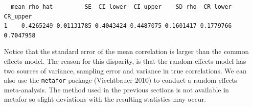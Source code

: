 \documentclass[
  letterpaper,
  DIV=11,
  numbers=noendperiod]{scrreprt}
\newenvironment{Shaded}{\begin{snugshade}}{\end{snugshade}}
\newcommand{\AttributeTok}[1]{\textcolor[rgb]{0.40,0.45,0.13}{#1}}
\newcommand{\CommentTok}[1]{\textcolor[rgb]{0.37,0.37,0.37}{#1}}
\newcommand{\DecValTok}[1]{\textcolor[rgb]{0.68,0.00,0.00}{#1}}
\newcommand{\FunctionTok}[1]{\textcolor[rgb]{0.28,0.35,0.67}{#1}}
\newcommand{\NormalTok}[1]{\textcolor[rgb]{0.00,0.23,0.31}{#1}}
\newcommand{\OtherTok}[1]{\textcolor[rgb]{0.00,0.23,0.31}{#1}}
\newcommand{\SpecialCharTok}[1]{\textcolor[rgb]{0.37,0.37,0.37}{#1}}
\begin{document}
\begin{Shaded}
\end{Shaded}

\begin{verbatim}
  mean_rho_hat         SE  CI_lower  CI_upper    SD_rho  CR_lower  CR_upper
1    0.4265249 0.01131785 0.4043424 0.4487075 0.1601417 0.1779766 0.7047958
\end{verbatim}

Notice that the standard error of the mean correlation is larger than
the common effects model. The reason for this disparity, is that the
random effects model has two sources of variance, sampling error and
variance in true correlations. We can also use the \texttt{metafor}
package (Viechtbauer 2010) to conduct a random effects meta-analysis.
The method used in the previous sections is not available in metafor so
slight deviations with the resulting statistics may occur.
\end{document}
